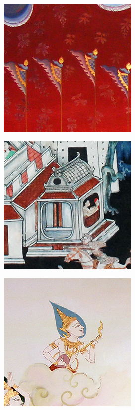 \documentclass[xcolor=dvipsnames, xetex,serif]{beamer}
\numberwithin{equation}{section}
\begin{document}
\begin{frame}
\begin{figure}[H]
\begin{subfigure}{0.3\linewidth}
					\includegraphics[width=0.7\linewidth]{images/result_ex4/multisplitbergman_case03.png}			
				\end{subfigure}
				\begin{subfigure}{0.3\linewidth}
					\centering
					\includegraphics[width=0.7\linewidth]{images/result_ex4/multisplitbergman_case04.png}			
				\end{subfigure}
				\begin{subfigure}{0.3\linewidth}
					\centering
					\includegraphics[width=0.7\linewidth]{images/result_ex4/multisplitbergman_case05.png}			

\end{subfigure}
\end{figure}
\end{frame}
\end{document}
